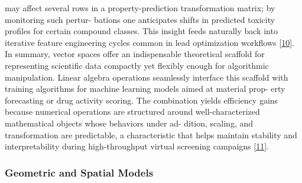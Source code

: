 \documentclass[
]{article}
\begin{document}
may affect several rows in a property-prediction transformation matrix;
by monitoring such pertur- bations one anticipates shifts in predicted
toxicity profiles for certain compound classes. This insight feeds
naturally back into iterative feature engineering cycles common in lead
optimization workflows {[}\protect\hyperlink{_bookmark50}{10}{]}. In
summary, vector spaces offer an indispensable theoretical scaffold for
representing scientific data compactly yet flexibly enough for
algorithmic manipulation. Linear algebra operations seamlessly interface
this scaffold with training algorithms for machine learning models aimed
at material prop- erty forecasting or drug activity scoring. The
combination yields efficiency gains because numerical operations are
structured around well-characterized mathematical objects whose
behaviors under ad- dition, scaling, and transformation are predictable,
a characteristic that helps maintain stability and interpretability
during high-throughput virtual screening campaigns
{[}\protect\hyperlink{_bookmark51}{11}{]}.

\hypertarget{geometric-and-spatial-models}{%
\subsubsection{Geometric and Spatial
Models}\label{geometric-and-spatial-models}}
\end{document}
